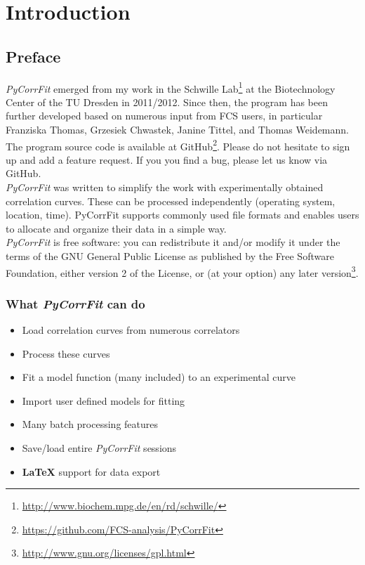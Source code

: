 \section{Introduction}
\label{sec:intro}
\subsection{Preface}
\label{sec:intro.prefa}
\textit{PyCorrFit} emerged from my work in the Schwille Lab\footnote{\url{http://www.biochem.mpg.de/en/rd/schwille/}} at the Biotechnology Center of the TU Dresden in 2011/2012. Since then, the program has been further developed based on numerous input from FCS users, in particular Franziska Thomas, Grzesiek Chwastek, Janine Tittel, and Thomas Weidemann. The program source code is available at GitHub\footnote{\url{https://github.com/FCS-analysis/PyCorrFit}}. Please do not hesitate to sign up and add a feature request. If you you find a bug, please let us know via GitHub.\\

\noindent \textit{PyCorrFit} was written to simplify the work with experimentally obtained correlation curves. These can be processed independently (operating system, location, time). PyCorrFit supports commonly used file formats and enables users to allocate and organize their data in a simple way.\\

\noindent \textit{PyCorrFit} is free software: you can redistribute it and/or modify it
under the terms of the GNU General Public License as published 
by the Free Software Foundation, either version 2 of the License, 
or (at your option) any later version\footnote{\url{http://www.gnu.org/licenses/gpl.html}}.


\subsubsection*{What \textit{PyCorrFit} can do}
\begin{itemize}
\item Load correlation curves from numerous correlators
\item Process these curves
\item Fit a model function (many included) to an experimental curve
\item Import user defined models for fitting
\item Many batch processing features
\item Save/load entire \textit{PyCorrFit} sessions
\item \textbf{\LaTeX} support for data export
\end{itemize}

